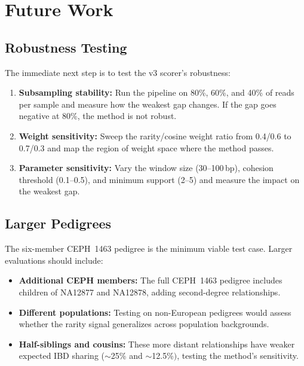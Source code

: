 \documentclass{../yalumba}
\begin{document}
\section{Future Work}
\label{sec:future}

\subsection{Robustness Testing}

The immediate next step is to test the v3 scorer's robustness:

\begin{enumerate}
  \item \textbf{Subsampling stability:}  Run the pipeline on 80\%, 60\%, and
        40\% of reads per sample and measure how the weakest gap changes.
        If the gap goes negative at 80\%, the method is not robust.
  \item \textbf{Weight sensitivity:}  Sweep the rarity/cosine weight ratio
        from 0.4/0.6 to 0.7/0.3 and map the region of weight space where
        the method passes.
  \item \textbf{Parameter sensitivity:}  Vary the window size (30--100\,bp),
        cohesion threshold (0.1--0.5), and minimum support (2--5) and measure
        the impact on the weakest gap.
\end{enumerate}

\subsection{Larger Pedigrees}

The six-member CEPH~1463 pedigree is the minimum viable test case.  Larger
evaluations should include:

\begin{itemize}
  \item \textbf{Additional CEPH members:}  The full CEPH~1463 pedigree
        includes children of NA12877 and NA12878, adding second-degree
        relationships.
  \item \textbf{Different populations:}  Testing on non-European pedigrees
        would assess whether the rarity signal generalizes across population
        backgrounds.
  \item \textbf{Half-siblings and cousins:}  These more distant relationships
        have weaker expected IBD sharing ($\sim$25\% and $\sim$12.5\%$)$,
        testing the method's sensitivity.
\end{itemize}
\end{document}
